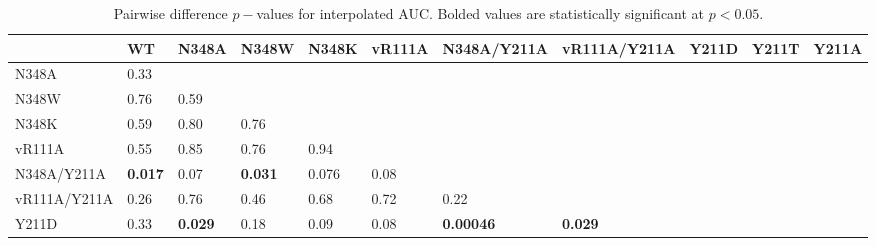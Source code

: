 \documentclass[12pt]{article}
\begin{document}
\begin {table}[H]
\caption{\label{tab:AUC_p}Pairwise difference $p-$values for interpolated AUC. Bolded values are statistically significant at $p<0.05$.}
\begin{center}
  \resizebox{16cm}{!} {
    \begin{tabular}{l l l l l l l l l l l}
    \hline
                & WT                      & N348A                   & N348W                   & N348K                   & vR111A                  & N348A/Y211A               & vR111A/Y211A            & Y211D                   & Y211T                   & Y211A  \\ \hline
    N348A       & 0.33                    &                         &                         &                         &                         &                           &                         &                         &                         &        \\
    N348W       & 0.76                    & 0.59                    &                         &                         &                         &                           &                         &                         &                         &        \\
    N348K       & 0.59                    & 0.80                    & 0.76                    &                         &                         &                           &                         &                         &                         &        \\
   vR111A       & 0.55                    & 0.85                    & 0.76                    & 0.94                    &                         &                           &                         &                         &                         &        \\
    N348A/Y211A & \textbf{0.017}          & 0.07                    & \textbf{0.031}          & 0.076                   & 0.08                    &                           &                         &                         &                         &        \\
   vR111A/Y211A & 0.26                    & 0.76                    & 0.46                    & 0.68                    & 0.72                    & 0.22                      &                         &                         &                         &        \\
    Y211D       & 0.33                    & \textbf{0.029}          & 0.18                    & 0.09                    & 0.08                    & \textbf{0.00046}          & \textbf{0.029}          &                         &                         &        \\

\end{tabular}}
\end{center}
\end{table}
\end{document}
